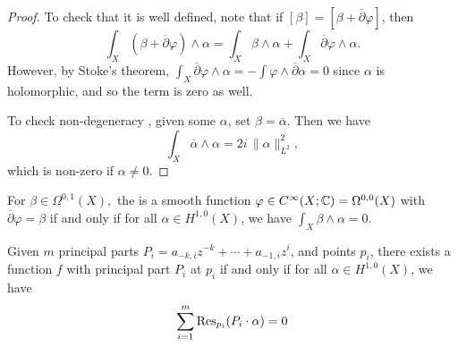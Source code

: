 \documentclass{lkx_paper}
\begin{document}
\begin{proof}
	To check that it is well defined, note that if $[\beta]=[\beta + \overline{\partial}\varphi]$, then
	\[
		\int_X(\beta +\overline{\partial}\varphi)\wedge \alpha = \int_X \beta\wedge \alpha + \int_X \overline{\partial}\varphi \wedge \alpha.
	\]
	However, by Stoke's theorem, $\int_X \overline{\partial}\varphi \wedge \alpha = -\int \varphi \wedge \overline{\partial}\alpha=0$ since $\alpha$ is holomorphic, and so the term is zero as well.

	To check non-degeneracy , given some $\alpha$, set $\beta = \overline{\alpha}$. Then we have
	\[
		\int_X \overline{\alpha}\wedge \alpha = 2i\,\|\alpha\|^2_{L^2},
	\]
	which is non-zero if $\alpha\neq 0$.
\end{proof}

\begin{corollary}
	For $\beta\in \Omega^{0,1}(X),$ the is a smooth function $\varphi\in C^\infty(X; \mathbb{C})=\Omega^{0,0}(X)$ with $\overline{\partial}\varphi = \beta$ if and only if for all $\alpha\in H^{1,0}(X)$, we have $\int_X \beta\wedge \alpha = 0$.
\end{corollary}

\begin{theorem}
	Given $m$ principal parts $P_i=a_{-k,i}z^{-k}+\cdots + a_{-1,i} z^i$, and points $p_i$, there exists a function $f$ with principal part $P_i$ at $p_i$ if and only if for all $\alpha\in H^{1,0}(X)$, we have
	\[
		\sum^m_{i=1} \mathrm{Res}_{p_i}(P_i\cdot \alpha)=0
	\]
\end{theorem}
\end{document}
